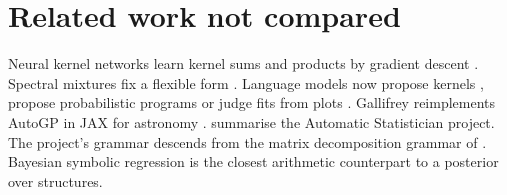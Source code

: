 \documentclass[
]{article}
\begin{document}
\section{Related work not compared}\label{related-work-not-compared}

Neural kernel networks learn kernel sums and products by gradient
descent \autocite{sun2018nkn}. Spectral mixtures fix a flexible form
\autocite{wilson2013spectral}. Language models now propose kernels
\autocite{suwandi2025cake}, propose probabilistic programs
\autocite{li2024boxlm} or judge fits from plots
\autocite{lee2025multimodal}. Gallifrey reimplements AutoGP in JAX for
astronomy \autocite{boettner2025gallifrey}.
\textcite{steinruecken2019automatic} summarise the Automatic
Statistician project. The project's grammar descends from the matrix
decomposition grammar of \textcite{grosse2012compositionality}. Bayesian
symbolic regression \autocite{jin2019bsr,guimera2020bms} is the closest
arithmetic counterpart to a posterior over structures.

\printbibliography[title=References]
\end{document}
